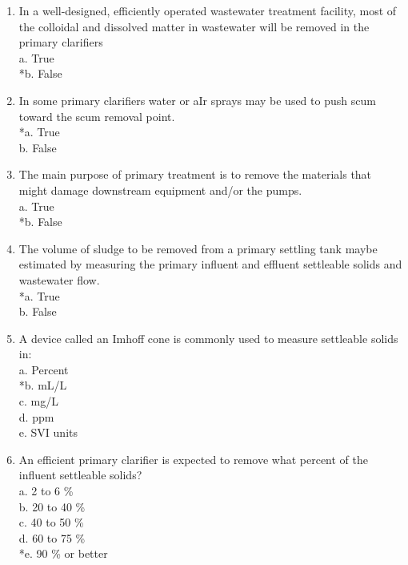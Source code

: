\begin{enumerate}
\item  In a well-designed, efficiently operated wastewater treatment facility, most of the colloidal and dissolved matter in wastewater will be removed in the primary clarifiers \\

a. True \\
*b. False \\


\item  In some primary clarifiers water or aIr sprays may be used to push scum toward the scum removal point. \\

*a. True \\
b. False \\


\item  The main purpose of primary treatment is to remove the materials that might damage downstream equipment and/or the pumps. \\

a. True \\
*b. False \\


\item  The volume of sludge to be removed from a primary settling tank maybe estimated by measuring the primary influent and effluent settleable solids and wastewater flow. \\

*a. True \\
b. False \\

\item  A device called an Imhoff cone is commonly used to measure settleable solids in: \\

a. Percent \\
*b. mL/L \\
c. mg/L \\
d. ppm \\
e. SVI units \\


\item  An efficient primary clarifier is expected to remove what percent of the influent settleable solids? \\

a. 2 to 6 \% \\
b. 20 to 40 \% \\
c. 40 to 50 \% \\
d. 60 to 75 \% \\
*e. 90 \% or better \\



\end{enumerate}
